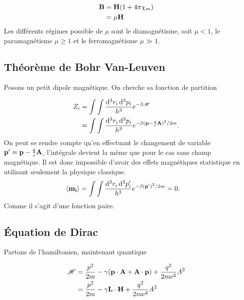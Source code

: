 \begin{align}
    \vb{B}&=\vb{H}\qty(1+4\pi\chi_m)\\
          &=\mu\vb{H}
\end{align}
Les différents régimes possible de $\mu$ sont le diamagnétisme, soit $\mu<1$,
le paramagnétisme $\mu\ge1$ et le ferromagnétisme $\mu\gg1$.


\subsection{Théorème de Bohr Van-Leuven} %
\label{sub:Théorème de Bohr Van-Leuven}

Posons un petit dipole magnétique. On cherche sa fonction de partition

\begin{align}
    Z_i&=\int\int\frac{\dd[3]{r_i}\dd[3]{p_i}}{h^3}e^{-\beta \mathscr{H}}\\
       &=\int\int\frac{\dd[3]{r_i}\dd[3]{p_i}}{h^3}e^{-\beta (\vb{p}-\frac qc\vb{A})^2/2m}.
\end{align}
On peut se rendre compte qu'en effectuant le changement de variable $\vb{p'}=\vb{p}-\frac qc\vb{A}$,
l'intégrale devient la même que pour le cas sans champ magnétique. Il est donc
impossible d'avoir des effets magnétiques statistique en utilisant seulement
la physique classique.
\begin{align}
    \expval{\vb{m_i}}&=
       \int\int\frac{\dd[3]{r_i}\dd[3]{p_i'}}{h^3}e^{-\beta (\vb{p'})^2/2m} = 0.
\end{align}
Comme il s'agit d'une fonction paire.


\subsection{Équation de Dirac} %
\label{sub:Équation de Dirac}

Partons de l'hamiltonien, maintenant quantique

\begin{align}
    \mathscr{H}&=\frac{p^2}{2m}-\gamma\qty(\vb{p}\cdot\vb{A}+\vb{A}\cdot\vb{p})
    +\frac{q^2}{2mc^2}A^2\\
               &=\frac{p^2}{2m}-\gamma\vb{L}\cdot\vb{H}+\frac{q^2}{2mc^2}A^2
\end{align}



